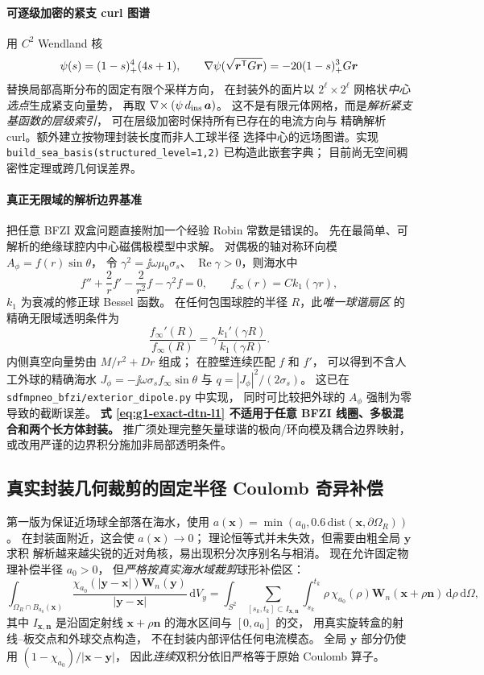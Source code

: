 \paragraph{可逐级加密的紧支 curl 图谱}
用 \(C^2\) Wendland 核
\[
\psi(s)=(1-s)_+^4(4s+1),\qquad
\nabla\psi(\sqrt{\bm r^{\mathsf T}G\bm r})
=-20(1-s)_+^3G\bm r
\]
替换局部高斯分布的固定有限个采样方向，
在封装外的面片以 \(2^\ell\times 2^\ell\)
网格状\emph{中心选点}生成紧支向量势，
再取 \(\nabla\!\times(\psi\,d_{\rm ins}\,\bm a)\)。
这不是有限元体网格，而是\emph{解析紧支基函数的层级索引}，
可在层级加密时保持所有已存在的电流方向与
精确解析 curl。额外建立按物理封装长度而非人工球半径
选择中心的远场图谱。实现
\texttt{build\_sea\_basis(structured\_level=1,2)} 已构造此嵌套字典；
目前尚无空间稠密性定理或跨几何误差界。

\paragraph{真正无限域的解析边界基准}
把任意 BFZI 双盒问题直接附加一个经验 Robin 常数是错误的。
先在最简单、可解析的绝缘球腔内中心磁偶极模型中求解。
对偶极的轴对称环向模 \(A_\phi=f(r)\sin\theta\)，
令 \(\gamma^2=\jj\omega\mu_0\sigma_s\)、
\(\operatorname{Re}\gamma>0\)，则海水中
\[
f''+\frac2r f'-\frac2{r^2}f-\gamma^2 f=0,\qquad
f_\infty(r)=Ck_1(\gamma r),
\]
\(k_1\) 为衰减的修正球 Bessel 函数。
在任何包围球腔的半径 \(R\)，此\emph{唯一球谐扇区}
的精确无限域透明条件为
\begin{equation}
\boxed{\frac{f_\infty'(R)}{f_\infty(R)}
=\gamma\frac{k_1'(\gamma R)}{k_1(\gamma R)}.}
\label{eq:g1-exact-dtn-l1}
\end{equation}
内侧真空向量势由 \(M/r^2+Dr\) 组成；
在腔壁连续匹配 \(f\) 和 \(f'\)，
可以得到不含人工外球的精确海水 \(J_\phi=-\jj\omega\sigma_s
f_\infty\sin\theta\) 与 \(q=|J_\phi|^2/(2\sigma_s)\)。
这已在 \texttt{sdfmpneo\_bfzi/exterior\_dipole.py} 中实现，
同时可比较把外球的 \(A_\phi\) 强制为零导致的截断误差。
\textbf{式 \eqref{eq:g1-exact-dtn-l1} 不适用于任意 BFZI
线圈、多极混合和两个长方体封装。}
推广须处理完整矢量球谐的极向/环向模及耦合边界映射，
或改用严谨的边界积分施加非局部透明条件。

\subsection{真实封装几何裁剪的固定半径 Coulomb 奇异补偿}
第一版为保证近场球全部落在海水，使用
\(a(\bm x)=\min(a_0,0.6\,\mathrm{dist}(\bm x,\partial\Omega_R))\)。
在封装面附近，这会使 \(a(\bm x)\to0\)；
理论恒等式并未失效，但需要由粗全局 \(\bm y\) 求积
解析越来越尖锐的近对角核，易出现积分次序别名与相消。
现在允许固定物理补偿半径 \(a_0>0\)，
但\emph{严格按真实海水域裁剪}球形补偿区：
\[
\int_{\Omega_R\cap B_{a_0}(\bm x)}
\frac{\chi_{a_0}(|\bm y-\bm x|)\bm W_n(\bm y)}
{|\bm y-\bm x|}\,\mathrm dV_y
=\int_{S^2}\sum_{[s_k,t_k]\subset I_{\bm x,\bm n}}
\int_{s_k}^{t_k}\rho\,\chi_{a_0}(\rho)
\bm W_n(\bm x+\rho\bm n)\,\mathrm d\rho\,\mathrm d\Omega,
\]
其中 \(I_{\bm x,\bm n}\) 是沿固定射线
\(\bm x+\rho\bm n\) 的海水区间与 \([0,a_0]\) 的交，
用真实旋转盒的射线--板交点和外球交点构造，
不在封装内部评估任何电流模态。
全局 \(\bm y\) 部分仍使用
\((1-\chi_{a_0})/|\bm x-\bm y|\)，
因此\emph{连续}双积分依旧严格等于原始 Coulomb 算子。

